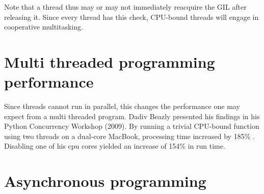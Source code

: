 Note that a thread thus may or may not immediately reacquire the GIL after releasing it.
Since every thread has this check, CPU-bound threads will engage in cooperative multitasking.

\section{Multi threaded programming performance}
\label{sct:multi_theaded_programming_performance}

Since threads cannot run in parallel, this changes the performance one may expect from a multi threaded program.
Dadiv Beazly presented his findings in his Python Concurrency Workshop (2009).
By running a trivial CPU-bound function using two threads on a dual-core MacBook, processing time increased by 185\% \cite{beazley2009inside}.
Disabling one of his cpu cores yielded an increase of 154\% in run time.




\section{Asynchronous programming}

